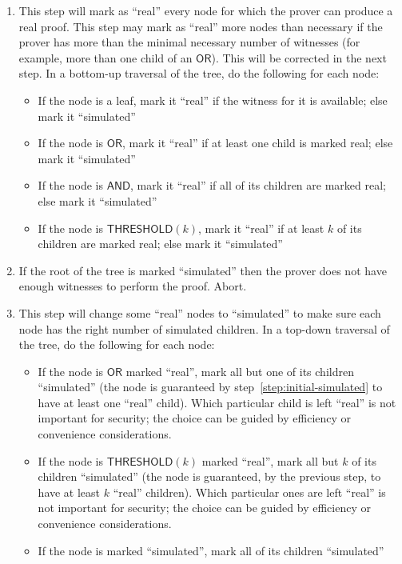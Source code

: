 \documentclass[11pt]{article}
\newcommand{\andnode}{\ensuremath{\mathsf{AND}}}
\newcommand{\ornode}{\ensuremath{\mathsf{OR}}}
\newcommand{\tnode}{\ensuremath{\mathsf{THRESHOLD}}}
\begin{document}
\begin{enumerate}
    \item \label{step:initial-simulated} This step will mark as ``real'' every node for which the prover can produce a real proof. This step may mark as ``real'' more nodes than necessary if the prover has more than the minimal necessary number of witnesses (for example, more than one child of an $\ornode$).  This will be corrected in the next step. In a bottom-up traversal of the tree, do the following for each node:
        \begin{itemize}
            \item If the node is a leaf, mark it ``real'' if the witness for it is available; else mark it ``simulated''
            \item If the node is $\ornode$, mark it ``real'' if at least one child is marked real; else mark it ``simulated''
            \item If the node is $\andnode$, mark it ``real'' if all of its children are marked real; else mark it ``simulated''
            \item If the node is $\tnode(k)$, mark it ``real'' if at least $k$ of its children are marked real; else mark it ``simulated''
        \end{itemize}

    \item If the root of the tree is marked ``simulated'' then the prover does not have enough witnesses to perform the proof. Abort.

    \item This step will change some ``real'' nodes to ``simulated'' to make sure each node has the right number of simulated children.
          In a top-down traversal of the tree, do the following for each node:
        \begin{itemize}
            \item
            If the node is $\ornode$ marked ``real'',  mark all but one of its children ``simulated''
            (the node is guaranteed by step~\ref{step:initial-simulated} to have at least one ``real'' child).
            Which particular child is left ``real'' is not important for security; the choice can be guided by efficiency or convenience considerations.
            \item
            If  the node is $\tnode(k)$ marked ``real'', mark all but $k$ of its children ``simulated''
            (the node is guaranteed, by the previous step, to have at least $k$ ``real'' children).
            Which particular ones are left ``real'' is not important for security; the choice can be guided by efficiency or convenience considerations.
            \item
            If the node is marked ``simulated'', mark all of its children ``simulated''
        \end{itemize}
\end{enumerate}
\end{document}

